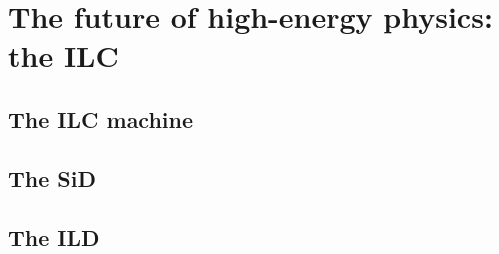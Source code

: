 \chapter{The future of high-energy physics: the ILC}

  \section{The ILC machine}

  \section{The SiD}

  \section{The ILD}

